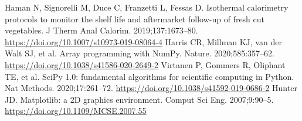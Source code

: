  Haman N, Signorelli M, Duce C, Franzetti L, Fessas D. Isothermal calorimetry protocols to monitor the shelf life and aftermarket follow-up of fresh cut vegetables. J Therm Anal Calorim. 2019;137:1673--80. \url{https://doi.org/10.1007/s10973-019-08064-4}
 Harris CR, Millman KJ, van der Walt SJ, et al. Array programming with NumPy. Nature. 2020;585:357--62. \url{https://doi.org/10.1038/s41586-020-2649-2}
 Virtanen P, Gommers R, Oliphant TE, et al. SciPy 1.0: fundamental algorithms for scientific computing in Python. Nat Methods. 2020;17:261--72. \url{https://doi.org/10.1038/s41592-019-0686-2}
 Hunter JD. Matplotlib: a 2D graphics environment. Comput Sci Eng. 2007;9:90--5. \url{https://doi.org/10.1109/MCSE.2007.55}
